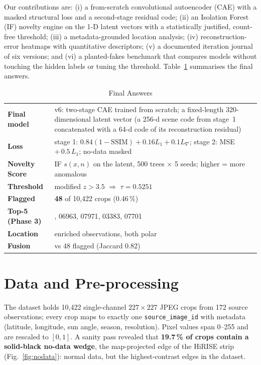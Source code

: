 \documentclass[conference]{IEEEtran}
\begin{document}
Our contributions are: (i) a from-scratch convolutional autoencoder (CAE) with a masked structural loss
and a second-stage residual code; (ii) an Isolation Forest (IF) novelty engine on the 1-D latent
vectors with a statistically justified, count-free threshold; (iii) a metadata-grounded location
analysis; (iv) reconstruction-error heatmaps with quantitative descriptors; (v) a documented iteration
journal of six versions; and (vi) a planted-fakes benchmark that compares models without touching the
hidden labels or tuning the threshold. Table~\ref{tab:final} summarises the final answers.

\begin{table}[!t]
\centering
\caption{Final Answers}
\label{tab:final}
\renewcommand{\arraystretch}{1.15}
\colorbox{answer}{\begin{tabular}{@{}>{\raggedright\arraybackslash}p{}>{\raggedright\arraybackslash}p{}@{}}
\textbf{Final model} & v6: two-stage CAE trained from scratch; a fixed-length 320-dimensional latent vector (a 256-d scene code from stage~1 concatenated with a 64-d code of its reconstruction residual) \\
\textbf{Loss} & stage 1: $0.84(1-\mathrm{SSIM}) + 0.16L_1 + 0.1L_{\nabla}$; stage 2: MSE $+\,0.5\,L_1$; no-data masked \\
\textbf{Novelty Score} & IF $s(x,n)$ on the latent, 500 trees $\times$ 5 seeds; higher = more anomalous \\
\textbf{Threshold} & modified $z > 3.5$ $\Rightarrow$ $\tau = \mathbf{0.5251}$ \\
\textbf{Flagged} & \textbf{48} of 10{,}422 crops (0.46\,\%) \\
\textbf{Top-5 (Phase 3)} & 06476, 06963, 07971, 03383, 07701 \\
\textbf{Location} & 2 enriched observations, both polar \\
\textbf{Fusion} & 54 vs 48 flagged (Jaccard 0.82) \\
\end{tabular}}
\end{table}

\section{Data and Pre-processing}
The dataset holds 10{,}422 single-channel $227\times227$ JPEG crops from 172 source observations;
every crop maps to exactly one \texttt{source\_image\_id} with metadata (latitude, longitude, sun angle,
season, resolution). Pixel values span 0--255 and are rescaled to $[0,1]$. A sanity pass revealed that
\textbf{19.7\,\% of crops contain a solid-black no-data wedge}, the map-projected edge of the HiRISE strip
(Fig.~\ref{fig:nodata}): normal data, but the highest-contrast edges in the dataset.
\end{document}
